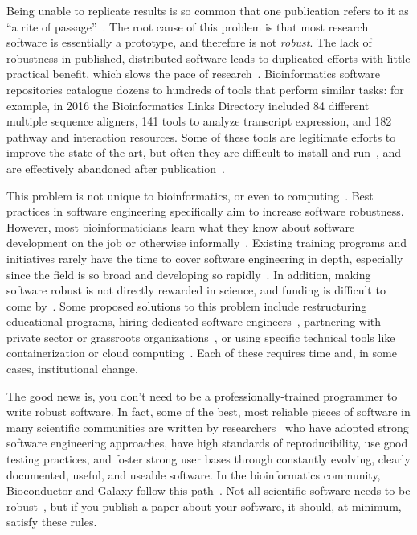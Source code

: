 \documentclass[10pt,letterpaper]{article}
\begin{document}
Being unable to replicate results is so common that one publication
refers to it as ``a rite of passage''~\cite{baker2016}.  The root
cause of this problem is that most research software is essentially a
prototype, and therefore is not \emph{robust}. The lack of robustness
in published, distributed software leads to duplicated efforts with
little practical benefit, which slows the pace of
research~\cite{prabhu2011,lawlor2015}.  Bioinformatics software
repositories \cite{ison2016,brazas2012} catalogue dozens to hundreds
of tools that perform similar tasks: for example, in 2016 the
Bioinformatics Links Directory included 84 different multiple sequence
aligners, 141 tools to analyze transcript expression, and 182 pathway
and interaction resources.  Some of these tools are legitimate efforts
to improve the state-of-the-art, but often they are difficult to
install and run~\cite{stajich2002,Seemann2013}, and are effectively
abandoned after publication~\cite{nekrutenko2012}.

This problem is not unique to bioinformatics, or even to
computing~\cite{baker2016}.  Best practices in software engineering
specifically aim to increase software robustness. However, most
bioinformaticians learn what they know about software development on
the job or otherwise informally~\cite{prins2015,atwood2015}.  Existing
training programs and initiatives rarely have the time to cover
software engineering in depth, especially since the field is so broad
and developing so rapidly~\cite{atwood2015,lawlor2015}.  In addition,
making software robust is not directly rewarded in science, and
funding is difficult to come by~\cite{prins2015}. Some proposed
solutions to this problem include restructuring educational programs,
hiring dedicated software engineers~\cite{lawlor2015,sanders2008},
partnering with private sector or grassroots
organizations~\cite{prins2015,ison2016}, or using specific technical
tools like containerization or cloud
computing~\cite{afgan2016,howe2012}. Each of these requires time and,
in some cases, institutional change.

The good news is, you don't need to be a professionally-trained
programmer to write robust software.  In fact, some of the best, most
reliable pieces of software in many scientific communities are written
by researchers~\cite{prabhu2011,sanders2008} who have adopted strong
software engineering approaches, have high standards of
reproducibility, use good testing practices, and foster strong user
bases through constantly evolving, clearly documented, useful, and
useable software.  In the bioinformatics community, Bioconductor and
Galaxy follow this path~\cite{gentleman2004,afgan2016}.  Not all
scientific software needs to be robust~\cite{varoquaux2015}, but if
you publish a paper about your software, it should, at minimum,
satisfy these rules.
\end{document}
